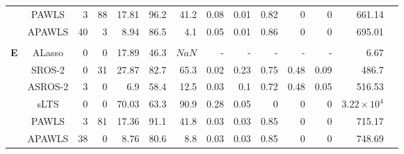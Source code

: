 \documentclass{article}\usepackage[]{graphicx}\usepackage[]{color}
\begin{document}
\begin{table}[thp]
\begin{center}
\begin{tabular}{ccrrrrrrrrrrrr}
	      & PAWLS & 3 & 88 & 17.81 & 
	      96.2 & 41.2 &
	      0.08 & 0.01 & 0.82
	      & 0 & 0 & 661.14\\
	      
	      & APAWLS & 40 & 3 & 8.94 & 
	      86.5 & 4.1 &
	      0.05 & 0.01 & 0.86
	      & 0 & 0 & 695.01\\
	      
	      \\
	       	  \multirow{8}{*}{{\bf E}}
	      & ALasso & 0 & 0 & 17.89 & 
	      46.3 & \ensuremath{NaN} & - & - & - & - & - & 6.67\\
	      
	      & SROS-2 & 0 & 31 & 27.87 & 
	      82.7 & 65.3 &
	      0.02 & 0.23 & 0.75
	      & 0.48 & 0.09 & 486.7\\
	      
	     & ASROS-2 & 3 & 0 & 6.9 & 
	      58.4 & 12.5 &
	      0.03 & 0.1 & 0.72
	      & 0.48 & 0.05 & 516.53\\
	      
	       & sLTS & 0 & 0 & 70.03 & 
	      63.3 & 90.9 &
	      0.28 & 0.05 & 0
	      & 0 & 0 & \ensuremath{3.22\times 10^{4}}\\
	      
	      & PAWLS & 3 & 81 & 17.36 & 
	      91.1 & 41.8 &
	      0.03 & 0.03 & 0.85
	      & 0 & 0 & 715.17\\
	      
	      & APAWLS & 38 & 0 & 8.76 & 
	      80.6 & 8.8 &
	      0.03 & 0.03 & 0.85
	      & 0 & 0 & 748.69\\
	      
	   \hline\hline
	
	\end{tabular}
	\end{center}
	\end{table}
	
\end{document}
